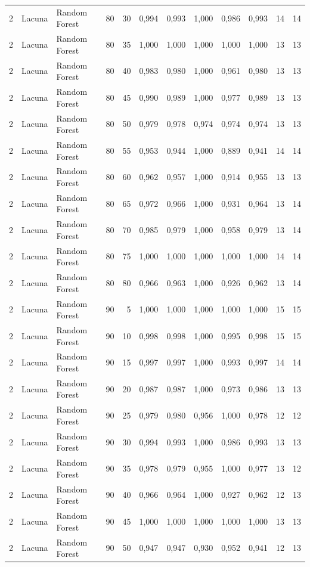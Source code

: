 \begin{longtable}{@{}rllrrrrrrrrr@{}}
2 & Lacuna & Random Forest & 80 & 30 & 0,994 & 0,993 & 1,000 & 0,986 & 0,993 & 14 & 14 \\
2 & Lacuna & Random Forest & 80 & 35 & 1,000 & 1,000 & 1,000 & 1,000 & 1,000 & 13 & 13 \\
2 & Lacuna & Random Forest & 80 & 40 & 0,983 & 0,980 & 1,000 & 0,961 & 0,980 & 13 & 13 \\
2 & Lacuna & Random Forest & 80 & 45 & 0,990 & 0,989 & 1,000 & 0,977 & 0,989 & 13 & 13 \\
2 & Lacuna & Random Forest & 80 & 50 & 0,979 & 0,978 & 0,974 & 0,974 & 0,974 & 13 & 13 \\
2 & Lacuna & Random Forest & 80 & 55 & 0,953 & 0,944 & 1,000 & 0,889 & 0,941 & 14 & 14 \\
2 & Lacuna & Random Forest & 80 & 60 & 0,962 & 0,957 & 1,000 & 0,914 & 0,955 & 13 & 13 \\
2 & Lacuna & Random Forest & 80 & 65 & 0,972 & 0,966 & 1,000 & 0,931 & 0,964 & 13 & 14 \\
2 & Lacuna & Random Forest & 80 & 70 & 0,985 & 0,979 & 1,000 & 0,958 & 0,979 & 13 & 14 \\
2 & Lacuna & Random Forest & 80 & 75 & 1,000 & 1,000 & 1,000 & 1,000 & 1,000 & 14 & 14 \\
2 & Lacuna & Random Forest & 80 & 80 & 0,966 & 0,963 & 1,000 & 0,926 & 0,962 & 13 & 14 \\
2 & Lacuna & Random Forest & 90 & 5 & 1,000 & 1,000 & 1,000 & 1,000 & 1,000 & 15 & 15 \\
2 & Lacuna & Random Forest & 90 & 10 & 0,998 & 0,998 & 1,000 & 0,995 & 0,998 & 15 & 15 \\
2 & Lacuna & Random Forest & 90 & 15 & 0,997 & 0,997 & 1,000 & 0,993 & 0,997 & 14 & 14 \\
2 & Lacuna & Random Forest & 90 & 20 & 0,987 & 0,987 & 1,000 & 0,973 & 0,986 & 13 & 13 \\
2 & Lacuna & Random Forest & 90 & 25 & 0,979 & 0,980 & 0,956 & 1,000 & 0,978 & 12 & 12 \\
2 & Lacuna & Random Forest & 90 & 30 & 0,994 & 0,993 & 1,000 & 0,986 & 0,993 & 13 & 13 \\
2 & Lacuna & Random Forest & 90 & 35 & 0,978 & 0,979 & 0,955 & 1,000 & 0,977 & 13 & 12 \\
2 & Lacuna & Random Forest & 90 & 40 & 0,966 & 0,964 & 1,000 & 0,927 & 0,962 & 12 & 13 \\
2 & Lacuna & Random Forest & 90 & 45 & 1,000 & 1,000 & 1,000 & 1,000 & 1,000 & 13 & 13 \\
2 & Lacuna & Random Forest & 90 & 50 & 0,947 & 0,947 & 0,930 & 0,952 & 0,941 & 12 & 13 \\

\end{longtable}
